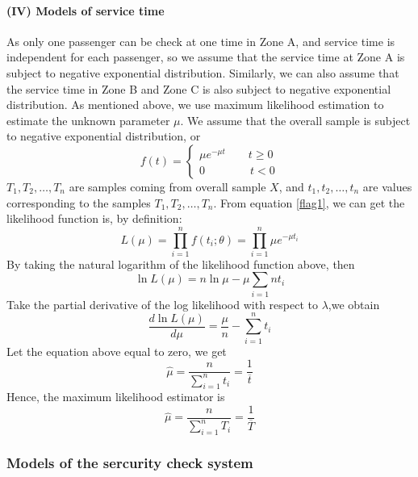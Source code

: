 \documentclass{mcmthesis}
\begin{document}
		\paragraph{(IV) Models of service time}%
		As only one passenger can be check at one time in Zone A, and service time is independent for each passenger, so we assume that the service time at Zone A is subject to negative exponential distribution. Similarly, we can also assume that the service time in Zone B and Zone C is also subject to negative exponential distribution. As mentioned above, we use maximum likelihood estimation to estimate the unknown parameter ${\mu}$.
		We assume that the overall sample is subject to negative exponential distribution, or
			\begin{equation}    
				f(t)=\left  \{
      					 \begin{array}{lr}
        					   \mu e^{-\mu t}\qquad t\geqslant 0\\
         				   0\qquad\qquad t<0
       			 		\end{array}
				\right.
			\end{equation}
		${T_1, T_2, \dots , T_n}$ are samples coming from overall sample ${X}$, and ${t_1, t_2, \dots , t_n}$ are values corresponding to the samples  ${T_1, T_2, \dots , T_n}$. 
		From equation \eqref{flag1}, we can get the likelihood function is, by definition:
			\begin{equation}
				L(\mu ) = \prod_{i=1}^{n} f(t_i; \theta) = \prod_{i=1}^{n}\mu e^{- \mu t_i}
			\end{equation}
		By taking  the natural logarithm of the likelihood function above, then
			$${{\ln L(\mu)} = n\ln \mu - \mu \sum_{i=1}{n}t_i}$$
		Take the partial derivative of the log likelihood with respect to ${\lambda}$,we obtain
			$${ \frac {d \ln L(\mu)}{d \mu} = \frac {\mu}{n} -\sum_{i=1}^{n} t_i }$$
		Let the equation above equal to zero, we get
			\begin{equation}
				\hat \mu = \frac{n}{\sum\limits_{i=1}^{n} t_i} = \frac {1}{ \overline t}
 			\end{equation}
		Hence, the  maximum likelihood estimator is
			\begin{equation}
				\hat \mu = \frac{n}{\sum\limits_{i=1}^{n} T_i} = \frac {1}{ \overline T}
			\end{equation}		
			
	\subsubsection{Models of the sercurity check system}%
\end{document}
